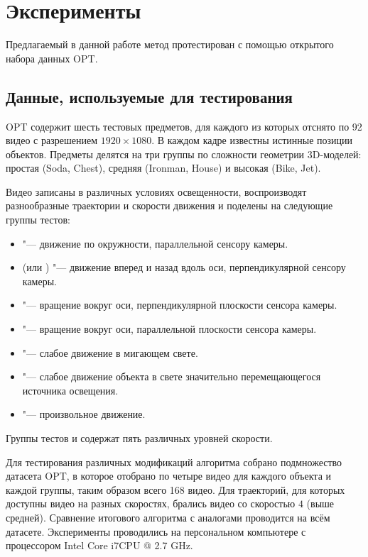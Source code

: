\section{Эксперименты}\label{experiments}

Предлагаемый в данной работе метод протестирован с помощью открытого набора
данных OPT\cite{OPT}.

\subsection{Данные, используемые для тестирования}

OPT содержит шесть тестовых предметов, для каждого из которых отснято
по 92 видео с разрешением $1920\times1080$.
В каждом кадре известны истинные позиции объектов.
Предметы делятся на три группы по сложности геометрии 3D-моделей: простая
(Soda, Chest), средняя (Ironman, House) и высокая (Bike, Jet).

Видео записаны в различных условиях освещенности, воспроизводят разнообразные
траектории и скорости движения и поделены на следующие группы тестов:
\begin{itemize}
    \item {} "--- движение по окружности, параллельной
        сенсору камеры.
    \item {} (или ) "--- движение вперед и
        назад вдоль оси, перпендикулярной сенсору камеры.
    \item {} "--- вращение вокруг оси, перпендикулярной
        плоскости сенсора камеры.
    \item {} "--- вращение вокруг оси, параллельной
        плоскости сенсора камеры.
    \item {} "--- слабое движение в мигающем свете.
    \item {} "--- слабое движение объекта в свете значительно
        перемещающегося источника освещения.
    \item {} "--- произвольное движение.
\end{itemize}
Группы тестов  и  содержат пять различных
уровней скорости.

Для тестирования различных модификаций алгоритма собрано подмножество датасета
OPT, в которое отобрано по
четыре видео для каждого объекта и каждой группы, таким образом всего 168
видео.
Для траекторий, для которых доступны видео на разных скоростях, брались видео
со скоростью $4$ (выше средней).
Сравнение итогового алгоритма с аналогами проводится на всём датасете.
Эксперименты проводились на персональном компьютере с процессором Intel Core
i7CPU @ 2.7 GHz.

